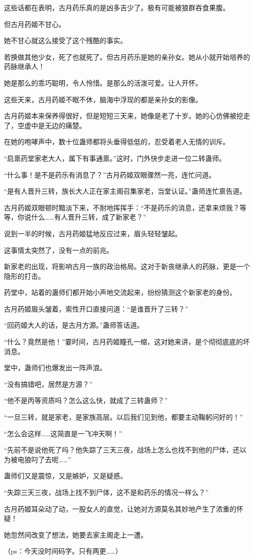 \begin{this_body}
这些话都在表明，古月药乐真的是凶多吉少了。极有可能被狼群吞食果腹。

但古月药姬不甘心。

她不甘心就这么接受了这个残酷的事实。

若换做其他少女，死了也就死了。但古月药乐是她的亲孙女。她从小就开始培养的药脉继承人！

她是那么的乖巧聪明，令人怜惜。是那么的活泼可爱。让人开怀。

这些天来，古月药姬不眠不休，脑海中浮现的都是亲孙女的影像。

古月药姬本来保养得很好，但是短短三天来，她像是老了十岁。她的心仿佛被挖走了，空虚中是无边的痛楚。

在她的咆哮声中，数十位蛊师都将头垂得低低的，忍受着老人无情的训斥。

“启禀药堂家老大人，属下有事通禀。”这时，门外快步走进一位二转蛊师。

“什么事！是不是药乐有消息了？”古月药姬双眼骤然一亮，连忙问道。

“是有人晋升三转，族长大人正在家主阁召集家老，当堂认证。”蛊师连忙禀告道。

古月药姬双眼顿时黯淡下来，不耐地挥挥手：“不是药乐的消息，还拿来烦我？等等，你说什么……有人晋升三转，成了新家老？”

说到一半的时候，古月药姬猛地反应过来，眉头轻轻皱起。

这事情太突然了，没有一点的前兆。

新家老的出现，将影响古月一族的政治格局。这对于新丧继承人的药脉，更是一个隐形的打击。

药堂中，站着的蛊师们都开始小声地交流起来，纷纷猜测这个新家老的身份。

古月药姬眉头皱着，索性开口直接问道：“是谁晋升了三转？”

“回药姬大人的话，是古月方源。”蛊师答话道。

“什么？竟然是他！”霎时间，古月药姬瞳孔一缩，这对她来讲，是个彻彻底底的坏消息。

堂中，蛊师们也爆发出一阵声浪。

“没有搞错吧，居然是方源？”

“他不是丙等资质吗？怎么这么快，就成了三转蛊师？”

“一旦三转，就是家老，是家族高层。以后我们见到他，都要主动鞠躬问好的！”

“怎么会这样……这简直是一飞冲天啊！”

“先前不是说他死了吗？他失踪了三天三夜，战场上怎么也找不到他的尸体，还以为被电狼叼了去呢……”

蛊师们又是震惊，又是嫉妒，又是疑惑。

“失踪三天三夜，战场上找不到尸体，这不是和药乐的情况一样么？”

古月药姬耳朵动了动，一股女人的直觉，让她对方源莫名其妙地产生了浓重的怀疑！

她忽然间改变了想法，她要去家主阁走上一遭。

（ps：今天没时间码字。只有两更……）

\end{this_body}

